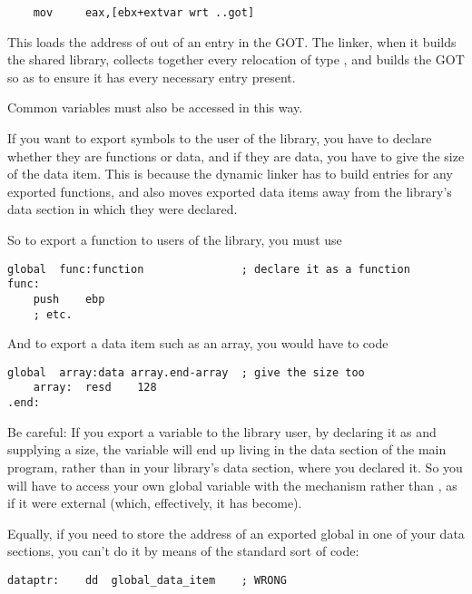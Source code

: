 \begin{lstlisting}
    mov     eax,[ebx+extvar wrt ..got]
\end{lstlisting}

This loads the address of  out of an entry in the GOT. The
linker, when it builds the shared library, collects together every
relocation of type , and builds the GOT so as to ensure it
has every necessary entry present.

Common variables must also be accessed in this way.


If you want to export symbols to the user of the library, you have
to declare whether they are functions or data, and if they are data,
you have to give the size of the data item. This is because the
dynamic linker has to build 
entries for any exported functions, and also moves exported data
items away from the library's data section in which they were
declared.

So to export a function to users of the library, you must use

\begin{lstlisting}
global  func:function               ; declare it as a function
func:
    push    ebp
    ; etc.
\end{lstlisting}

And to export a data item such as an array, you would have to code

\begin{lstlisting}
global  array:data array.end-array  ; give the size too
    array:  resd    128
.end:
\end{lstlisting}

Be careful: If you export a variable to the library user, by
declaring it as  and supplying a size, the variable will
end up living in the data section of the main program, rather than
in your library's data section, where you declared it. So you will
have to access your own global variable with the  mechanism
rather than , as if it were external (which,
effectively, it has become).

Equally, if you need to store the address of an exported global in
one of your data sections, you can't do it by means of the standard
sort of code:

\begin{lstlisting}
dataptr:    dd  global_data_item    ; WRONG
\end{lstlisting}

